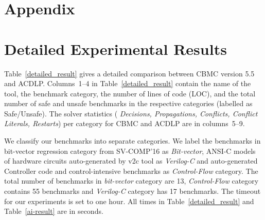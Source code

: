 \appendix
\section*{Appendix}
%
\section{Detailed Experimental Results}\label{appendix:extended_result}
Table~\ref{detailed_result} gives a detailed comparison between CBMC version
5.5 and ACDLP.  Columns~1--4 in Table~\ref{detailed_result} contain the
name of the tool, the benchmark category, the number of lines of code (LOC),
and the total number of safe and unsafe benchmarks in the respective
categories (labelled as Safe/Unsafe).  The solver statistics ({\em
Decisions, Propagations, Conflicts, Conflict Literals, Restarts}) per
category for CBMC and ACDLP are in columns~5--9.
%

We classify our benchmarks into separate categories. 
We label the benchmarks in bit-vector regression category from SV-COMP'16 
as {\em Bit-vector}, ANSI-C models of hardware circuits auto-generated by v2c 
tool as {\em Verilog-C} and auto-generated Controller code and control-intensive 
benchmarks as {\em Control-Flow} category.  The total number of benchmarks in 
{\em bit-vector} category are 13, {\em Control-Flow} category contains 
55 benchmarks and {\em Verilog-C} category has 17 benchmarks. The timeout for 
our experiments is set to one hour.  All times in Table~\ref{detailed_result} 
and Table~\ref{ai-result} are in seconds. 

